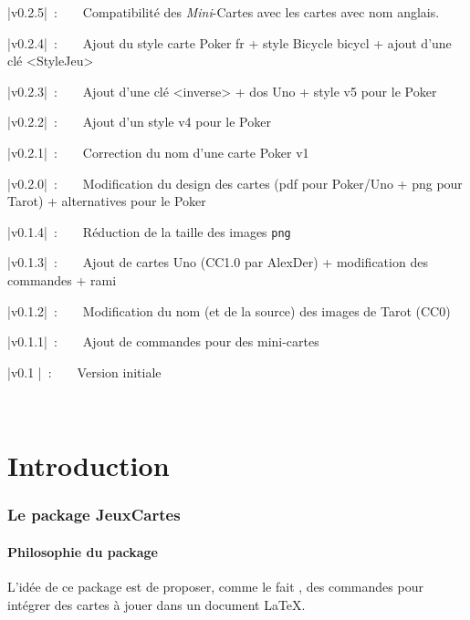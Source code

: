 \documentclass[a4paper]{article}
\newcommand\ctex[1]{\tcbox[vignettelatex]{#1}\xspace}
\begin{document}
{\small \bverb|v0.2.5|~:~~~~Compatibilité des \textit{Mini}-Cartes avec les cartes avec nom anglais.

{\small \bverb|v0.2.4|~:~~~~Ajout du style carte Poker \textsf{fr} + style Bicycle \textsf{bicycl} + ajout d'une clé \textsf{<StyleJeu>}

{\small \bverb|v0.2.3|~:~~~~Ajout d'une clé \textsf{<inverse>} + dos Uno + style \textsf{v5} pour le Poker

{\small \bverb|v0.2.2|~:~~~~Ajout d'un style \textsf{v4} pour le Poker

{\small \bverb|v0.2.1|~:~~~~Correction du nom d'une carte Poker \textsf{v1}

{\small \bverb|v0.2.0|~:~~~~Modification du design des cartes (pdf pour Poker/Uno + png pour Tarot) + alternatives pour le Poker

{\small \bverb|v0.1.4|~:~~~~Réduction de la taille des images \texttt{png}

{\small \bverb|v0.1.3|~:~~~~Ajout de cartes Uno (CC1.0 par AlexDer) + modification des commandes + rami

{\small \bverb|v0.1.2|~:~~~~Modification du nom (et de la source) des images de Tarot (CC0)

{\small \bverb|v0.1.1|~:~~~~Ajout de commandes pour des mini-cartes

{\small \bverb|v0.1  |~:~~~~Version initiale

\vfill~

\newpage

\part*{Introduction}

\section{Le package JeuxCartes}

\subsection{\og Philosophie \fg{} du package}

\begin{codeidee}
L'idée de ce package est de proposer, comme le fait \ctex{pst-poker}, des commandes pour intégrer des cartes à jouer dans un document \LaTeX.


\end{codeidee}}}}}}}}}}}}
\end{document}
